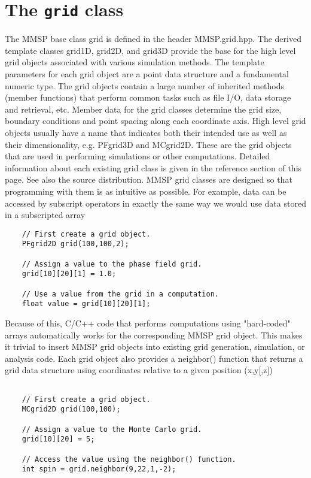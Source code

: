 
\chapter{The {\tt grid} class}

The MMSP base class grid is defined in the header MMSP.grid.hpp. The derived template classes grid1D, grid2D, and grid3D provide the base for the high level grid objects associated with various simulation methods. The template parameters for each grid object are a point data structure and a fundamental numeric type. The grid objects contain a large number of inherited methods (member functions) that perform common tasks such as file I/O, data storage and retrieval, etc. Member data for the grid classes determine the grid size, boundary conditions and point spacing along each coordinate axis. 
High level grid objects usually have a name that indicates both their intended use as well as their dimensionality, e.g. PFgrid3D and MCgrid2D. These are the grid objects that are used in performing simulations or other computations. Detailed information about each existing grid class is given in the reference section of this page. See also the source distribution. 
MMSP grid classes are designed so that programming with them is as intuitive as possible. For example, data can be accessed by subscript operators in exactly the same way we would use data stored in a subscripted array 
\begin{verbatim}
    // First create a grid object.
    PFgrid2D grid(100,100,2);

    // Assign a value to the phase field grid.
    grid[10][20][1] = 1.0;

    // Use a value from the grid in a computation.
    float value = grid[10][20][1];
\end{verbatim}
Because of this, C/C++ code that performs computations using "hard-coded" arrays automatically works for the corresponding MMSP grid object. This makes it trivial to insert MMSP grid objects into existing grid generation, simulation, or analysis code. 
Each grid object also provides a neighbor() function that returns a grid data structure using coordinates relative to a given position (x,y[,z]) 
\begin{verbatim}

    // First create a grid object.
    MCgrid2D grid(100,100);

    // Assign a value to the Monte Carlo grid.
    grid[10][20] = 5;

    // Access the value using the neighbor() function.
    int spin = grid.neighbor(9,22,1,-2);
\end{verbatim}
